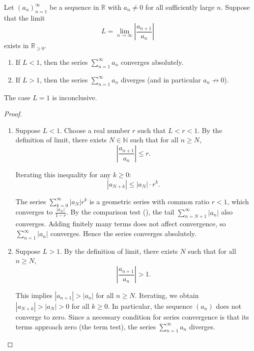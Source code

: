 \begin{theorem} \label{theorem:ratio_test_for_absolute_convergence_of_series}
    Let $(a_n)_{n=1}^\infty$ be a sequence in $\mathbb{R}$ with $a_n \neq 0$ for all sufficiently large $n$. Suppose that the limit
    $$L = \lim_{n \to \infty} \left| \frac{a_{n+1}}{a_n} \right|$$
    exists in $\mathbb{R}_{\geq 0}$.

    \begin{enumerate}
        \item If $L < 1$, then the series $\sum_{n=1}^\infty a_n$ converges absolutely.
        \item If $L > 1$, then the series $\sum_{n=1}^\infty a_n$ diverges (and in particular $a_n \not\to 0$).
    \end{enumerate}
    The case $L = 1$ is inconclusive.
\end{theorem}
\begin{proof}
    \begin{enumerate}
        \item Suppose $L < 1$. Choose a real number $r$ such that $L < r < 1$. By the definition of limit, there exists $N \in \mathbb{N}$ such that for all $n \geq N$,
        $$\left| \frac{a_{n+1}}{a_n} \right| \leq r.$$

        Iterating this inequality for any $k \geq 0$:
        $$|a_{N+k}| \leq |a_N| \cdot r^k.$$

        The series $\sum_{k=0}^\infty |a_N| r^k$ is a geometric series with common ratio $r < 1$, which converges to $\frac{|a_N|}{1-r}$. By the comparison test (), the tail $\sum_{n=N+1}^\infty |a_n|$ also converges. Adding finitely many terms does not affect convergence, so $\sum_{n=1}^\infty |a_n|$ converges. Hence the series converges absolutely.

        \item Suppose $L > 1$. By the definition of limit, there exists $N$ such that for all $n \geq N$,
        $$\left| \frac{a_{n+1}}{a_n} \right| > 1.$$

        This implies $|a_{n+1}| > |a_n|$ for all $n \geq N$. Iterating, we obtain $|a_{N+k}| > |a_N| > 0$ for all $k \geq 0$. In particular, the sequence $(a_n)$ does not converge to zero. Since a necessary condition for series convergence is that its terms approach zero (the term test), the series $\sum_{n=1}^\infty a_n$ diverges.
    \end{enumerate}
\end{proof}

